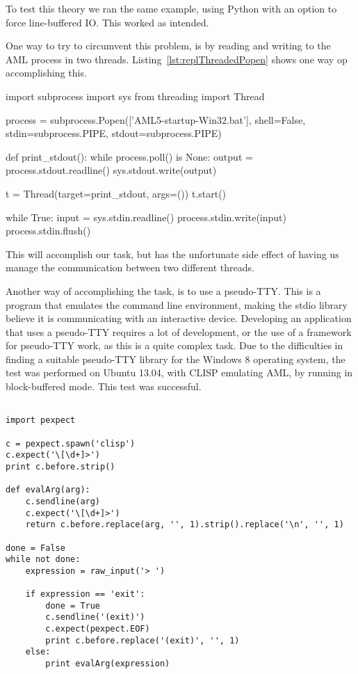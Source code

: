 To test this theory we ran the same example, using Python with an option to force line-buffered IO. This worked as intended.

One way to try to circumvent this problem, is by reading and writing to the AML process in two threads. Listing~\ref{lst:replThreadedPopen} shows one way op accomplishing this.

\begin{python}[caption={Python AML REPL with two threads},label={lst:replThreadedPopen}]
import subprocess
import sys
from threading import Thread

process = subprocess.Popen(['AML5-startup-Win32.bat'], shell=False, stdin=subprocess.PIPE, stdout=subprocess.PIPE)

def print_stdout():
        while process.poll() is None:
                output = process.stdout.readline()
                sys.stdout.write(output)

t = Thread(target=print_stdout, args=())
t.start()

while True:
        input = sys.stdin.readline()
        process.stdin.write(input)
        process.stdin.flush()
\end{python}

This will accomplish our task, but has the unfortunate side effect of having us manage the communication between two different threads.

Another way of accomplishing the task, is to use a pseudo-TTY. This is a program that emulates the command line environment, making the stdio library believe it is communicating with an interactive device. Developing an application that uses a pseudo-TTY requires a lot of development, or the use of a framework for pseudo-TTY work, as this is a quite complex task. Due to the difficulties in finding a suitable pseudo-TTY library for the Windows 8 operating system, the test was performed on Ubuntu 13.04, with CLISP emulating AML, by running in block-buffered mode. This test was successful.

\pythonstyle
\begin{lstlisting}[caption={Python CLISP REPL with pseudo-TTY},label={lst:replPseudoTty}]

import pexpect

c = pexpect.spawn('clisp')
c.expect('\[\d+]>')
print c.before.strip()

def evalArg(arg):
    c.sendline(arg)
    c.expect('\[\d+]>')
    return c.before.replace(arg, '', 1).strip().replace('\n', '', 1)

done = False
while not done:
    expression = raw_input('> ')

    if expression == 'exit':
        done = True
        c.sendline('(exit)')
        c.expect(pexpect.EOF)
        print c.before.replace('(exit)', '', 1)
    else:
        print evalArg(expression)
\end{lstlisting}

